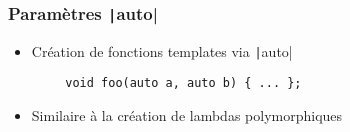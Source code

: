 \documentclass[C++.tex]{subfiles}
\begin{document}
\begin{frame}[fragile]
	\frametitle{Paramètres \texttt|auto|}
	\begin{itemize}
		\item Création de fonctions templates via \texttt|auto|
	\end{itemize}

	\begin{verbatim}
		void foo(auto a, auto b) { ... };
	\end{verbatim}

	\begin{itemize}
		\item Similaire	à la création de lambdas polymorphiques
	\end{itemize}

\end{frame}
\end{document}
